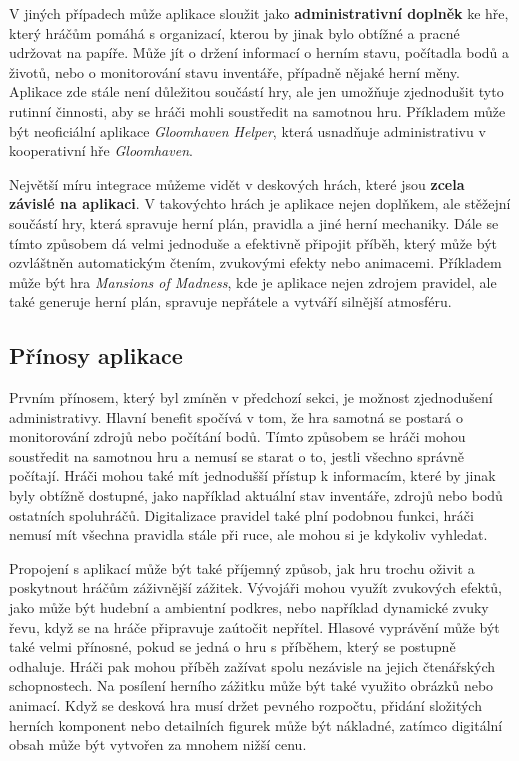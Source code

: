 V jiných případech může aplikace sloužit jako \textbf{administrativní doplněk} ke hře, který hráčům pomáhá s organizací, kterou by jinak bylo obtížné a pracné udržovat na papíře. Může jít o držení informací o herním stavu, počítadla bodů a životů, nebo o monitorování stavu inventáře, případně nějaké herní měny. Aplikace zde stále není důležitou součástí hry, ale jen umožňuje zjednodušit tyto rutinní činnosti, aby se hráči mohli soustředit na samotnou hru. Příkladem může být neoficiální aplikace \textit{Gloomhaven Helper}, která usnadňuje administrativu v kooperativní hře \textit{Gloomhaven}.

Největší míru integrace můžeme vidět v deskových hrách, které jsou \textbf{zcela závislé na aplikaci}. V takovýchto hrách je aplikace nejen doplňkem, ale stěžejní součástí hry, která spravuje herní plán, pravidla a jiné herní mechaniky. Dále se tímto způsobem dá velmi jednoduše a efektivně připojit příběh, který může být ozvláštněn automatickým čtením, zvukovými efekty nebo animacemi. Příkladem může být hra \textit{Mansions of Madness}, kde je aplikace nejen zdrojem pravidel, ale také generuje herní plán, spravuje nepřátele a vytváří silnější atmosféru.

\subsection{Přínosy aplikace}
\label{subsec:app_benefits}

Prvním přínosem, který byl zmíněn v předchozí sekci, je možnost zjednodušení administrativy. Hlavní benefit spočívá v tom, že hra samotná se postará o monitorování zdrojů nebo počítání bodů. Tímto způsobem se hráči mohou soustředit na samotnou hru a nemusí se starat o to, jestli všechno správně počítají. Hráči mohou také mít jednodušší přístup k informacím, které by jinak byly obtížně dostupné, jako například aktuální stav inventáře, zdrojů nebo bodů ostatních spoluhráčů. Digitalizace pravidel také plní podobnou funkci, hráči nemusí mít všechna pravidla stále při ruce, ale mohou si je kdykoliv vyhledat.

Propojení s aplikací může být také příjemný způsob, jak hru trochu oživit a poskytnout hráčům záživnější zážitek. Vývojáři mohou využít zvukových efektů, jako může být hudební a ambientní podkres, nebo například dynamické zvuky řevu, když se na hráče připravuje zaútočit nepřítel. Hlasové vyprávění může být také velmi přínosné, pokud se jedná o hru s příběhem, který se postupně odhaluje. Hráči pak mohou příběh zažívat spolu nezávisle na jejich čtenářských schopnostech. Na posílení herního zážitku může být také využito obrázků nebo animací. Když se desková hra musí držet pevného rozpočtu, přidání složitých herních komponent nebo detailních figurek může být nákladné, zatímco digitální obsah může být vytvořen za mnohem nižší cenu.


